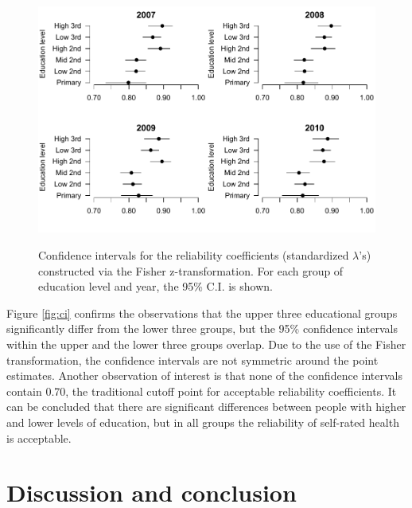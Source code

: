 \documentclass[a4paper, 11pt]{article}
\renewcommand{\l}{\lambda}
\newcommand{\0}{\boldsymbol{0}}
\begin{document}
\begin{figure}[bth]
\begin{center}
\caption{Confidence intervals for the reliability coefficients (standardized $\l$'s) constructed via the Fisher z-transformation. For each group of  education level and year, the 95\% C.I. is shown.}\label{fig:ci}
\includegraphics[width=.99\textwidth]{CI}
\label{default}
\end{center}
\end{figure}

Figure \ref{fig:ci} confirms the observations that the upper three educational groups significantly differ from the lower three groups, but
the 95\% confidence intervals within the upper and the lower three groups overlap. Due to the use of the Fisher transformation, the
confidence intervals are not symmetric around the point estimates. Another observation of interest is that none of the confidence
intervals contain 0.70, the traditional cutoff point for acceptable reliability coefficients. It can be concluded that there
are significant differences between people with higher and lower levels of education, but in all groups the reliability of self-rated health
is acceptable.



\section{Discussion and conclusion}
\end{document}
